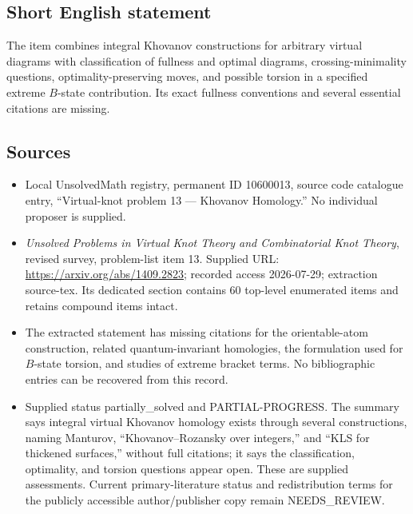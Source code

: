 \documentclass[11pt]{article}
\begin{document}
\subsection{Short English statement}
The item combines integral Khovanov constructions for arbitrary virtual diagrams with classification of fullness and optimal diagrams, crossing-minimality questions, optimality-preserving moves, and possible torsion in a specified extreme \(B\)-state contribution. Its exact fullness conventions and several essential citations are missing.
\subsection{Sources}
\begin{itemize}
\item Local UnsolvedMath registry, permanent ID 10600013, source code catalogue entry, ``Virtual-knot problem 13 --- Khovanov Homology.'' No individual proposer is supplied.
\item \emph{Unsolved Problems in Virtual Knot Theory and Combinatorial Knot Theory}, revised survey, problem-list item 13. Supplied URL: \url{https://arxiv.org/abs/1409.2823}; recorded access 2026-07-29; extraction source-tex. Its dedicated section contains 60 top-level enumerated items and retains compound items intact.
\item The extracted statement has missing citations for the orientable-atom construction, related quantum-invariant homologies, the formulation used for \(B\)-state torsion, and studies of extreme bracket terms. No bibliographic entries can be recovered from this record.
\item Supplied status partially\_solved and PARTIAL-PROGRESS. The summary says integral virtual Khovanov homology exists through several constructions, naming Manturov, ``Khovanov--Rozansky over integers,'' and ``KLS for thickened surfaces,'' without full citations; it says the classification, optimality, and torsion questions appear open. These are supplied assessments. Current primary-literature status and redistribution terms for the publicly accessible author/publisher copy remain NEEDS\_REVIEW.
\end{itemize}
\end{document}
